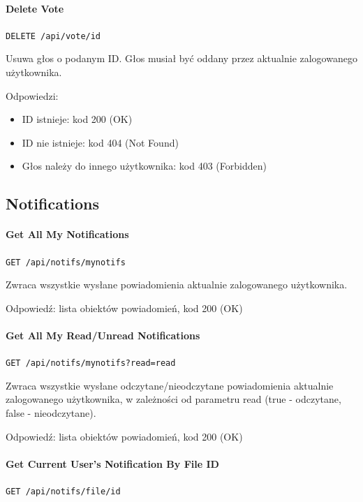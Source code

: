 \documentclass[a4paper,twoside,12pt]{book}
\begin{document}
\paragraph{Delete Vote}

\texttt{DELETE /api/vote/{id}}

Usuwa głos o podanym ID. Głos musiał być oddany przez aktualnie zalogowanego użytkownika.

Odpowiedzi: 
\begin{itemize}
	\item ID istnieje: kod 200 (OK) 
	\item ID nie istnieje: kod 404 (Not Found)
	\item Głos należy do innego użytkownika: kod 403 (Forbidden)
\end{itemize}

\subsection{Notifications}

\paragraph{Get All My Notifications}

\texttt{GET /api/notifs/mynotifs}

Zwraca wszystkie wysłane powiadomienia aktualnie zalogowanego użytkownika.

Odpowiedź: lista obiektów powiadomień, kod 200 (OK)

\paragraph{Get All My Read/Unread Notifications}

\texttt{GET /api/notifs/mynotifs?read={read}}

Zwraca wszystkie wysłane odczytane/nieodczytane powiadomienia aktualnie zalogowanego użytkownika, w zależności od parametru read (true - odczytane, false - nieodczytane).

Odpowiedź: lista obiektów powiadomień, kod 200 (OK)

\paragraph{Get Current User's Notification By File ID}

\texttt{GET /api/notifs/file/{id}}
\end{document}
